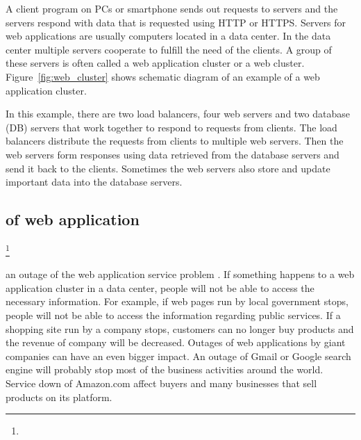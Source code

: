 A client program on PCs or smartphone sends out requests to servers\added{,} and the servers respond with data that is requested using HTTP or HTTPS. 
Servers for web applications are usually computers located in a data center.
In the data center multiple servers cooperate to fulfill the need of the clients.
A group of these servers is often called a web application cluster or a web cluster.
Figure~\ref{fig:web_cluster} shows schematic diagram of an example of a web application cluster.

In this example, there are two load balancers, four web servers and two database (DB) servers that work together to respond to  requests from  clients.
The load balancers distribute the requests from  clients to multiple web servers.
Then the web servers form responses using data retrieved from the database servers and send it back to the clients.
Sometimes the web servers also store and update important data into the database servers.

\subsection{ of web application}

\footnote{
  }

  an outage of the web application service  problem \cite{}.
If something happens to a web application cluster in a data center, people will not be able to access the necessary information.
%
For example, if web pages run by local government stops, people will not be able to access the information regarding public services.
If a shopping site run by a company stops, customers can no longer buy products and the revenue of  company will be  decreased.
Outages of web applications by giant companies can have an even bigger impact.
An outage of Gmail or Google search engine will probably stop most of the business activities around the world.
Service down of Amazon.com affect buyers and many businesses that sell products on its platform.

